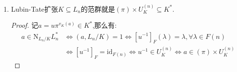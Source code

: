 \begin{enumerate}
\begin{proof}
		首先我们解释过$\pi$是一个范数($\mathrm{N}_{L_n/K}(-\lambda_n)=\pi$),于是$\pi$在范剩余符号下是平凡的,于是问题归结为设$a=u\in U_K$.设$\sigma$满足$\lambda^{\sigma}=[u^{-1}]_F(\lambda),\forall\lambda\in F(n)$,选取$\widetilde{\sigma}\in G(\widetilde{L_n}/K)$使得$\widetilde{\sigma}\mid L_n=\sigma$,并且有$d(\widetilde{\sigma})=1$(因为$K\subseteq L_n$是完全分歧的).记$\check{K}$为$\widetilde{K}$的完备化(这未必是一个代数扩张),记$\check{L_n}=L_n\check{K}$,把$\widetilde{\sigma}$视为$\check{L_n}$上的自同构,设$\widetilde{\sigma}$的固定域为$\Sigma$.那么$f_{\Sigma/K}=d_K(\widetilde{\sigma})=1$,于是$K\subset\Sigma$是一个完全分歧扩张,于是我们有如下两个扩张四边形,于是有$[\Sigma:K]=[\widetilde{\Sigma}:\widetilde{K}]=[\widetilde{L_n}:\widetilde{K}]=[L_n:K]=q^{n-1}(q-1)$.
		$$\xymatrix{\widetilde{\Sigma}\ar@{=}[rrrr]\ar@{-}[drr]\ar@{-}[dd]&&&&\widetilde{L_n}\ar@{-}[dll]\ar@{-}[dd]\\&&\widetilde{K}\ar@{-}[dd]&&\\\Sigma\ar@{-}[drr]&&&&L_n\ar@{-}[dll]\\&&K&&}$$
		
		记$\pi=u\pi‘$,设$\pi$和$\pi'$的Lubin-Tate级数分别为$e,e'$,取对应的Lubin-Tate模分别为$F,F'$,我们解释过存在低于1次项部分是$\varepsilon X$的形式幂级数$\theta(X)\in\mathscr{O}_{\check{K}}[[X]]$,其中$\varepsilon\in U_{\check{K}}$,满足$\theta^{\varphi}=\theta\circ[u]_{F'}$和$\theta^{\varphi}\circ e\circ\theta$.这里$\varphi=\varphi_K$.考虑$\lambda_n\in F'(n)-F'(n-1)$,它是$L_n$的素元.我们断言$\pi_{\Sigma}=\theta(\lambda_n)$是$\Sigma$上的素元:因为有$\pi_{\Sigma}^{\widetilde{\sigma}}=\theta^{\varphi}(\lambda_n^{\sigma})=\theta^{\varphi}([u^{-1}]_{F'}(\lambda_n))=\theta(\lambda_n)=\pi_{\Sigma}$,于是$\pi_{\Sigma}\in\Sigma$,它是素元因为$\lambda_n$是素元.
		
		现在$e^{(i)}(\theta(\lambda_n))=\theta^{\varphi^i}(\lambda_n^{\sigma})=\theta^{\varphi}((e')^{(i)}(\lambda_n))$,在$i=n$时为零,在$i=n-1$时非零.于是$\pi_{\Sigma}\in F(n)-F(n-1)$.于是有$\Sigma=K(\pi_{\Sigma})=K(F(n))$.并且$\mathrm{N}_{\Sigma/K}(-\pi_{\Sigma})=\pi=u\pi'$.但是$\pi'=\mathrm{N}_{L_n/K}(-\lambda_n)\in\mathrm{N}_{L_n/K}L_n^*$,于是有$r_{L_n/K}(\sigma)=\mathrm{N}_{\Sigma/K}(-\pi_{\Sigma})=\pi\equiv u(\mathrm{mod}\mathrm{N}_{L_n/K}L_n^*)$.于是有$(u,L_n/K)=\sigma$.
	\end{proof}
    \item Lubin-Tate扩张$K\subseteq L_n$的范群就是$(\pi)\times U_K^{(n)}\subseteq K^*$.
    \begin{proof}
    	
    	记$a=u\pi^{v_K(a)}\in K^*$,那么有:
    	\begin{align*}
    	a\in\mathrm{N}_{L_n/K}L_n^*&\Leftrightarrow(a,L_n/K)=1\Leftrightarrow[u^{-1}]_F(\lambda)=\lambda,\forall\lambda\in F(n)\\&\Leftrightarrow[u^{-1}]_F=\mathrm{id}_{F(n)}\Leftrightarrow u^{-1}\in U_K^{(n)}\Leftrightarrow a\in(\pi)\times U_K^{(n)}
    	\end{align*}
    \end{proof}
\end{enumerate}

